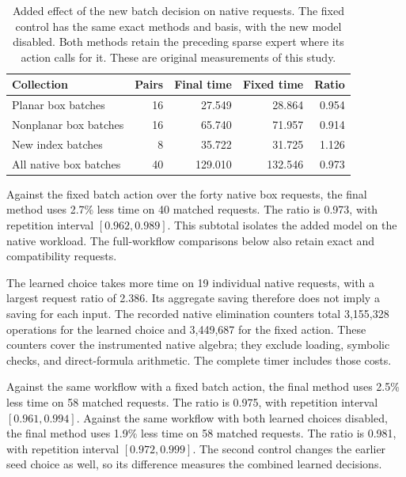 \begin{table}[!htbp]\centering\small
\caption{Added effect of the new batch decision on native requests. The fixed control has the same exact methods and basis, with the new model disabled. Both methods retain the preceding sparse expert where its action calls for it. These are original measurements of this study.}
\label{tab:notes-analytic-batch-ml}
\begin{tabularx}{\linewidth}{@{}Yrrrr@{}}\toprule
Collection & Pairs & Final time & Fixed time & Ratio\\\midrule
Planar box batches & 16 & 27.549 & 28.864 & 0.954 \\
Nonplanar box batches & 16 & 65.740 & 71.957 & 0.914 \\
New index batches & 8 & 35.722 & 31.725 & 1.126 \\
All native box batches & 40 & 129.010 & 132.546 & 0.973 \\
\bottomrule\end{tabularx}\end{table}

Against the fixed batch action over the forty native box requests, the final method uses 2.7\% less time on 40 matched requests. The ratio is 0.973, with repetition interval $[0.962,0.989]$. This subtotal isolates the added model on the native workload. The full-workflow comparisons below also retain exact and compatibility requests.

The learned choice takes more time on 19 individual native requests, with a largest request ratio of 2.386. Its aggregate saving therefore does not imply a saving for each input. The recorded native elimination counters total 3,155,328 operations for the learned choice and 3,449,687 for the fixed action. These counters cover the instrumented native algebra; they exclude loading, symbolic checks, and direct-formula arithmetic. The complete timer includes those costs.

Against the same workflow with a fixed batch action, the final method uses 2.5\% less time on 58 matched requests. The ratio is 0.975, with repetition interval $[0.961,0.994]$. Against the same workflow with both learned choices disabled, the final method uses 1.9\% less time on 58 matched requests. The ratio is 0.981, with repetition interval $[0.972,0.999]$. The second control changes the earlier seed choice as well, so its difference measures the combined learned decisions.


